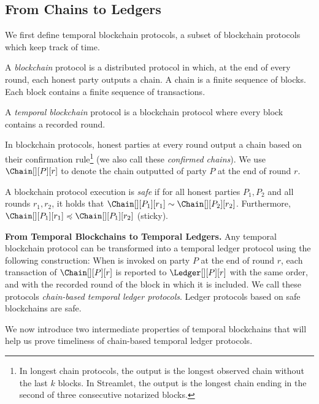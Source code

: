 \subsection{From Chains to Ledgers}

We first define temporal blockchain protocols,
a subset of blockchain protocols~\cite{rethinking-consensus}
which keep track of time.

\begin{definition}
  A \emph{blockchain} protocol is a distributed protocol
  in which, at the end of every round, each honest party outputs
  a chain. A chain is a finite sequence of blocks. Each block
  contains a finite sequence of transactions.

  A \emph{temporal blockchain} protocol is a blockchain protocol
  where every block contains a recorded round.
\end{definition}

In blockchain protocols, honest parties at every round output a chain
based on their confirmation rule\footnote{
  In longest chain protocols, the output is the longest observed chain without the last $k$ blocks.
  In Streamlet, the output is the longest chain ending in the second of three consecutive notarized
  blocks.
} (we also call these \emph{confirmed chains}).
We use $\Chain[][P][r]$ to denote the chain outputted
of party $P$ at the end of round $r$.

\begin{definition}
  A blockchain protocol execution is \emph{safe} if for
  all honest parties $P_1, P_2$ and all rounds $r_1, r_2$,
  it holds that $\Chain[][P_1][r_1] \sim \Chain[][P_2][r_2]$.
  Furthermore, $\Chain[][P_1][r_1] \preccurlyeq \Chain[][P_1][r_2]$ (sticky).
\end{definition}

\noindent
\textbf{From Temporal Blockchains to Temporal Ledgers.}
Any temporal blockchain protocol can be transformed into a
temporal ledger protocol using the following construction:
When \rread is invoked on party $P$ at the end of round $r$, each transaction of
$\Chain[][P][r]$ is reported to $\Ledger[][P][r]$ with the same order, and with
the recorded round of the block in which it is included.
We call these protocols \emph{chain-based temporal ledger protocols}.
Ledger protocols based on safe blockchains are safe.

We now introduce two intermediate properties of temporal blockchains
that will help us prove timeliness of
chain-based temporal ledger protocols.

